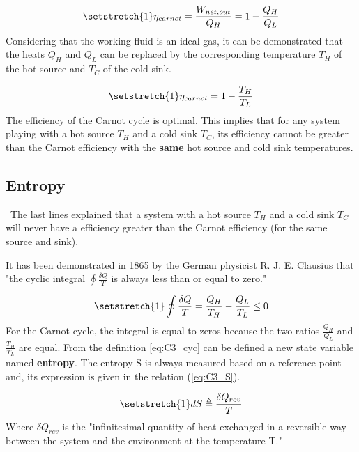 \begin{equation}
\setstretch{1}
\eta_{carnot} = \frac{W_{net,out}}{Q_H} = 1 - \frac{Q_H}{Q_L}\label{eq:C3_Carnoteff}
\end{equation} 
Considering that the working fluid is an ideal gas, it can be demonstrated that the heats $Q_H$ and $Q_L$ can be replaced by the corresponding temperature $T_H$ of the hot source and $T_C$ of the cold sink.

\begin{equation}
\setstretch{1}
\eta_{carnot}=1-\frac{T_H}{T_L}\label{eq:C3_eff_carnot}
\end{equation} 
The efficiency of the Carnot cycle is optimal. This implies that for any system playing with a hot source $T_H$ and a cold sink $T_C$, its efficiency cannot be greater than the Carnot efficiency with the \textbf{same} hot source and cold sink temperatures.
\subsection{Entropy}
\quad\ The last lines explained that a system with a hot source $T_H$ and a cold sink $T_C$ will never have a efficiency greater than the Carnot efficiency (for the same source and sink).

It has been demonstrated in 1865 by the German physicist R. J. E. Clausius that "the cyclic integral $\oint\frac{\delta Q}{T}$ is always less than or equal to zero."\cite{2015}

\begin{equation}
\setstretch{1}
\oint\frac{\delta Q}{T} = \frac{Q_H}{T_H} - \frac{Q_L}{T_L}\leq 0\label{eq:C3_cyc}
\end{equation}
For the Carnot cycle, the integral is equal to zeros because the two ratios $\frac{Q_H}{Q_L}$ and $\frac{T_H}{T_L}$ are equal.
From the definition \ref{eq:C3_cyc} can be defined a new state variable named \textbf{entropy}. The entropy S is always measured based on a reference point and, its expression is given in the relation (\ref{eq:C3_S}).

\begin{equation}
\setstretch{1}
dS \triangleq \frac{\delta Q_{rev}}{T}\label{eq:C3_S}
\end{equation}
Where $\delta Q_{rev}$ is the "infinitesimal quantity of heat exchanged in a reversible way between the system and the environment at the temperature T."\cite{Dewallef2019} 

